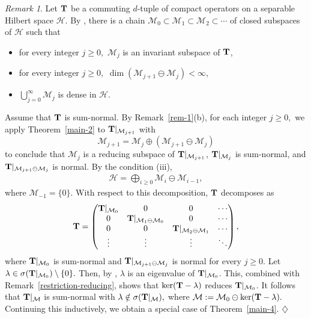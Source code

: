 \documentclass[10pt, a4paper, oneside, reqno]{amsproc}
\numberwithin{equation}{section}
\theoremstyle{remark}
\newtheorem{remark}[theorem]{Remark}
\theoremstyle{definition}
\newcommand*{\Ge}{\geqslant}
\begin{document}
\begin{remark}
Let ${\bf T}$ be a commuting $d$-tuple of compact operators on a separable Hilbert space $\mathcal H$. 
By \cite[Theorems~7.1.9 and 7.2.1]{RR2000}, 
there is a chain 
$\mathcal M_0 \subset \mathcal M_1 \subset \mathcal M_2 \subset \cdots$
of closed subspaces of $\mathcal H$ such that 
\begin{itemize}
		\item[(i)] for every integer $j \Ge 0,$ $\mathcal M_j$ is an invariant subspace of ${\bf T}$,   
		\item[(ii)] for every integer $j \Ge 0,$ $\dim(\mathcal M_{j+1} \ominus \mathcal M_j) < \infty$, 
		\item[(iii)] ${\bigcup_{j=0}^\infty \mathcal M_j}$ is dense in $\mathcal H.$
	\end{itemize}
Assume that ${\bf T}$ is sum-normal. By 
Remark~\ref{rem-1}(b), for each integer $j \Ge 0,$ we apply Theorem~\ref{main-2} to ${\bf T}|_{\mathcal M_{j+1}}$ with $$\mathcal M_{j+1} = \mathcal M_j \oplus (\mathcal M_{j+1} \ominus \mathcal M_j)$$ to conclude that
$\mathcal M_j$ is a reducing subspace of ${\bf T}|_{\mathcal M_{j+1}}$, ${\bf T}|_{\mathcal M_j}$ is sum-normal, and ${\bf T}|_{\mathcal M_{j+1} \ominus \mathcal M_j}$ is normal. By the condition (iii),   
\begin{align*} \mathcal H = \displaystyle \bigoplus_{i \Ge 0} \mathcal M_i \ominus \mathcal M_{i-1},
\end{align*}
where $\mathcal M_{-1}=\{0\}$. With respect to this decomposition, ${\bf T}$ decomposes as
\[
{\bf T}=
\begin{pmatrix}
{\bf T}|_{\mathcal M_0} & 0 & 0 & \cdots \\
0 & {\bf T}|_{\mathcal M_1 \ominus \mathcal M_0} & 0 & \cdots \\
0 & 0 & {\bf T}|_{\mathcal M_2 \ominus \mathcal M_1} & \cdots \\
\vdots & \vdots & \vdots & \ddots
\end{pmatrix},
\]
where ${\bf T}|_{\mathcal M_0}$ is sum-normal and ${\bf T}|_{\mathcal M_{j+1} \ominus \mathcal M_j}$ is normal for every $j \Ge 0.$ Let ${\lambda} \in \sigma({\bf T}|_{\mathcal M_0})\setminus \{{0}\}.$ Then, by \cite[Theorem 3.1]{B1996}, ${\lambda}$ is an eigenvalue of ${\bf T}|_{\mathcal M_0}$. This, combined with Remark~\ref{restriction-reducing}, shows that $\ker({\bf T}-{\lambda})$ reduces ${\bf T}|_{\mathcal M_0}$. It follows that ${\bf T}|_{\mathcal M}$ is sum-normal with ${\lambda} \notin \sigma({\bf T}|_{\mathcal M}),$ where $\mathcal M := \mathcal M_0 \ominus \ker({\bf T}-{\lambda}).$ Continuing this inductively, we obtain a special case of Theorem~\ref{main-4}. \hfill $\diamondsuit$
\end{remark}
\end{document}
